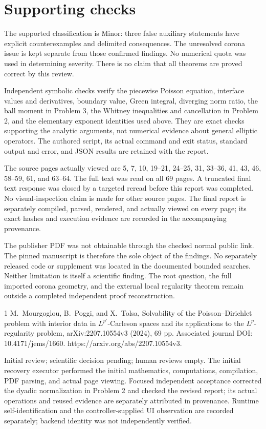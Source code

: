\documentclass[10pt]{article}
\begin{document}
\section*{Supporting checks}
The supported classification is Minor: three false auxiliary statements have explicit counterexamples and delimited consequences. The unresolved corona issue is kept separate from those confirmed findings. No numerical quota was used in determining severity. There is no claim that all theorems are proved correct by this review.\par
Independent symbolic checks verify the piecewise Poisson equation, interface values and derivatives, boundary value, Green integral, diverging norm ratio, the ball moment in Problem 3, the Whitney inequalities and cancellation in Problem 2, and the elementary exponent identities used above. They are exact checks supporting the analytic arguments, not numerical evidence about general elliptic operators. The authored script, its actual command and exit status, standard output and error, and JSON results are retained with the report.\par
The source pages actually viewed are 5, 7, 10, 19–21, 24–25, 31, 33–36, 41, 43, 46, 58–59, 61, and 63–64. The full text was read on all 69 pages. A truncated final text response was closed by a targeted reread before this report was completed. No visual-inspection claim is made for other source pages. The final report is separately compiled, parsed, rendered, and actually viewed on every page; its exact hashes and execution evidence are recorded in the accompanying provenance.\par
The publisher PDF was not obtainable through the checked normal public link. The pinned manuscript is therefore the sole object of the findings. No separately released code or supplement was located in the documented bounded searches. Neither limitation is itself a scientific finding. The root question, the full imported corona geometry, and the external local regularity theorem remain outside a completed independent proof reconstruction.\par
1 M. Mourgoglou, B. Poggi, and X. Tolsa, Solvability of the Poisson–Dirichlet problem with interior data in \(L^{p'}\)-Carleson spaces and its applications to the \(L^p\)-regularity problem, arXiv:2207.10554v3 (2024), 69 pp. Associated journal DOI: 10.4171/jems/1660. https://arxiv.org/abs/2207.10554v3.\par
Initial review; scientific decision pending; human reviews empty. The initial recovery executor performed the initial mathematics, computations, compilation, PDF parsing, and actual page viewing. Focused independent acceptance corrected the dyadic normalization in Problem 2 and checked the revised report; its actual operations and reused evidence are separately attributed in provenance. Runtime self-identification and the controller-supplied UI observation are recorded separately; backend identity was not independently verified.\par
\end{document}

